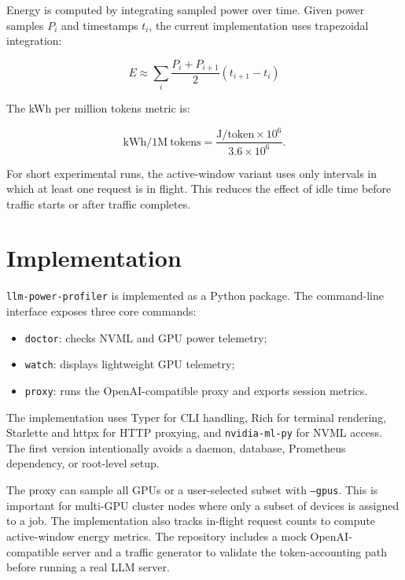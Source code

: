 \documentclass[conference]{IEEEtran}
\begin{document}
Energy is computed by integrating sampled power over time. Given power samples \(P_i\) and timestamps \(t_i\), the current implementation uses trapezoidal integration:

\begin{equation}
    E \approx \sum_i \frac{P_i + P_{i+1}}{2}(t_{i+1} - t_i)
\end{equation}

The kWh per million tokens metric is:

\begin{equation}
    \mathrm{kWh/1M\ tokens} =
    \frac{\mathrm{J/token} \times 10^6}{3.6 \times 10^6}.
\end{equation}

For short experimental runs, the active-window variant uses only intervals in which at least one request is in flight. This reduces the effect of idle time before traffic starts or after traffic completes.

\section{Implementation}

\texttt{llm-power-profiler} is implemented as a Python package. The command-line interface exposes three core commands:

\begin{itemize}
    \item \texttt{doctor}: checks NVML and GPU power telemetry;
    \item \texttt{watch}: displays lightweight GPU telemetry;
    \item \texttt{proxy}: runs the OpenAI-compatible proxy and exports session metrics.
\end{itemize}

The implementation uses Typer for CLI handling, Rich for terminal rendering, Starlette and httpx for HTTP proxying, and \texttt{nvidia-ml-py} for NVML access. The first version intentionally avoids a daemon, database, Prometheus dependency, or root-level setup.

The proxy can sample all GPUs or a user-selected subset with \texttt{--gpus}. This is important for multi-GPU cluster nodes where only a subset of devices is assigned to a job. The implementation also tracks in-flight request counts to compute active-window energy metrics. The repository includes a mock OpenAI-compatible server and a traffic generator to validate the token-accounting path before running a real LLM server.
\end{document}
